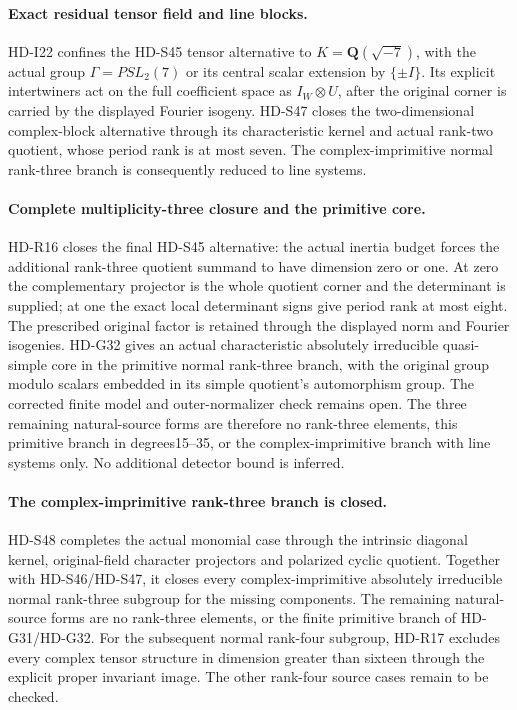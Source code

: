 \paragraph{Exact residual tensor field and line blocks.}
HD-I22 confines the HD-S45 tensor alternative to
\(K=\mathbf Q(\sqrt{-7})\), with the actual group
\(\Gamma=PSL_2(7)\) or its central scalar extension by
\(\{\pm I\}\). Its explicit intertwiners act on the full
coefficient space as \(I_W\otimes U\), after the original
corner is carried by the displayed Fourier isogeny.
HD-S47 closes the two-dimensional complex-block alternative
through its characteristic kernel and actual rank-two quotient,
whose period rank is at most seven. The complex-imprimitive
normal rank-three branch is consequently reduced to line systems.


\paragraph{Complete multiplicity-three closure and the primitive core.}
HD-R16 closes the final HD-S45 alternative: the actual inertia
budget forces the additional rank-three quotient summand to have
dimension zero or one. At zero the complementary projector is
the whole quotient corner and the determinant is supplied; at
one the exact local determinant signs give period rank at most
eight. The prescribed original factor is retained through the
displayed norm and Fourier isogenies. HD-G32 gives an actual
characteristic absolutely irreducible quasi-simple core in the
primitive normal rank-three branch, with the original group
modulo scalars embedded in its simple quotient's automorphism
group. The corrected finite model and outer-normalizer check
remains open. The three remaining natural-source forms are
therefore no rank-three elements, this primitive branch in
degrees15--35, or the complex-imprimitive branch with line
systems only. No additional detector bound is inferred.


\paragraph{The complex-imprimitive rank-three branch is closed.}
HD-S48 completes the actual monomial case through the intrinsic
diagonal kernel, original-field character projectors and polarized
cyclic quotient. Together with HD-S46/HD-S47, it closes every
complex-imprimitive absolutely irreducible normal rank-three
subgroup for the missing components. The remaining natural-source
forms are no rank-three elements, or the finite primitive branch
of HD-G31/HD-G32. For the subsequent normal rank-four subgroup,
HD-R17 excludes every complex tensor structure in dimension
greater than sixteen through the explicit proper invariant image.
The other rank-four source cases remain to be checked.


